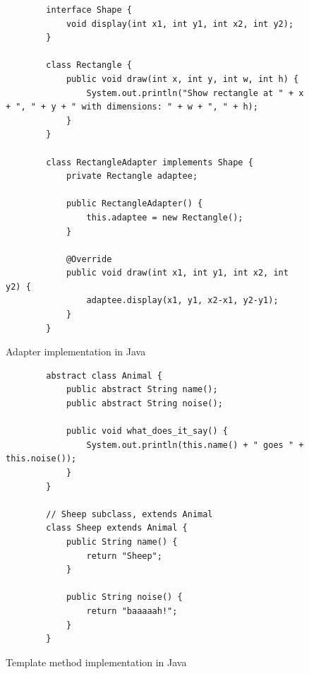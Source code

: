 \documentclass[conference]{IEEEtran}
\begin{document}
\begin{figure}[btp]
    \begin{verbatim}
        interface Shape {
            void display(int x1, int y1, int x2, int y2);
        }

        class Rectangle {
            public void draw(int x, int y, int w, int h) {
                System.out.println("Show rectangle at " + x + ", " + y + " with dimensions: " + w + ", " + h); 
            }
        }

        class RectangleAdapter implements Shape {
            private Rectangle adaptee;

            public RectangleAdapter() {
                this.adaptee = new Rectangle();
            }

            @Override
            public void draw(int x1, int y1, int x2, int y2) {
                adaptee.display(x1, y1, x2-x1, y2-y1);
            }
        }
    \end{verbatim}
    \caption{Adapter implementation in Java}
    \label{fig:adapter-java-impl}
\end{figure}

\begin{figure}[btp]
    \begin{verbatim}
        abstract class Animal {
            public abstract String name();
            public abstract String noise();

            public void what_does_it_say() {
                System.out.println(this.name() + " goes " + this.noise());
            }
        }

        // Sheep subclass, extends Animal 
        class Sheep extends Animal {
            public String name() {
                return "Sheep";
            }

            public String noise() {
                return "baaaaah!";
            }
        }
    \end{verbatim}
    \caption{Template method implementation in Java}
    \label{fig:template-java-impl}
\end{figure}
\end{document}
